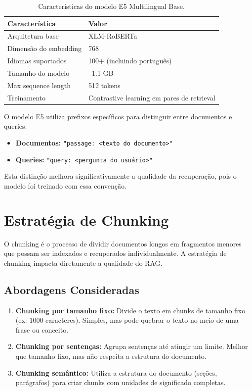 \begin{table}[H]
\centering
\caption{Características do modelo E5 Multilingual Base.}
\label{tab:e5_specs}
\begin{tabular}{l l}
\toprule
\textbf{Característica} & \textbf{Valor} \\
\midrule
Arquitetura base & XLM-RoBERTa \\
Dimensão do embedding & 768 \\
Idiomas suportados & 100+ (incluindo português) \\
Tamanho do modelo & ~1.1 GB \\
Max sequence length & 512 tokens \\
Treinamento & Contrastive learning em pares de retrieval \\
\bottomrule
\end{tabular}
\end{table}

\begin{infobox}
O modelo E5 utiliza prefixos específicos para distinguir entre documentos e queries:
\begin{itemize}
    \item \textbf{Documentos:} \texttt{"passage: <texto do documento>"}
    \item \textbf{Queries:} \texttt{"query: <pergunta do usuário>"}
\end{itemize}
Esta distinção melhora significativamente a qualidade da recuperação, pois o modelo foi treinado com essa convenção.
\end{infobox}

\section{Estratégia de Chunking}

O chunking é o processo de dividir documentos longos em fragmentos menores que possam ser indexados e recuperados individualmente. A estratégia de chunking impacta diretamente a qualidade do RAG.

\subsection{Abordagens Consideradas}

\begin{enumerate}
    \item \textbf{Chunking por tamanho fixo:} Divide o texto em chunks de tamanho fixo (ex: 1000 caracteres). Simples, mas pode quebrar o texto no meio de uma frase ou conceito.

    \item \textbf{Chunking por sentenças:} Agrupa sentenças até atingir um limite. Melhor que tamanho fixo, mas não respeita a estrutura do documento.

    \item \textbf{Chunking semântico:} Utiliza a estrutura do documento (seções, parágrafos) para criar chunks com unidades de significado completas.
\end{enumerate}

